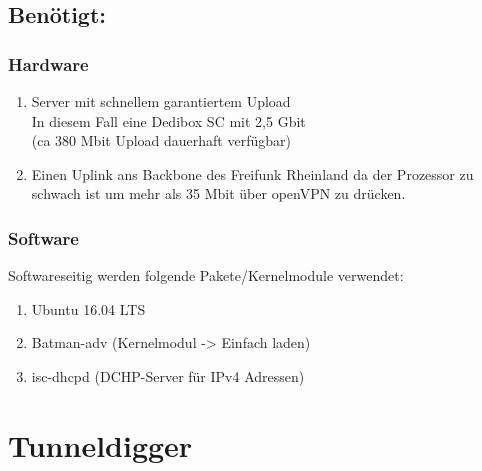 \subsection{Benötigt:}
\subsubsection{Hardware}
  \begin{enumerate}
    \item Server mit schnellem garantiertem Upload\\
          In diesem Fall eine Dedibox SC mit 2,5 Gbit \\
          (ca 380 Mbit Upload dauerhaft verfügbar)
    \item Einen Uplink ans Backbone des Freifunk Rheinland da der Prozessor zu schwach ist um mehr als 35 Mbit über openVPN zu drücken.  
  \end{enumerate}

\subsubsection{Software}
Softwareseitig werden folgende Pakete/Kernelmodule verwendet:
\begin{enumerate} 
   \item  Ubuntu 16.04 LTS 
   \item  Batman-adv (Kernelmodul -> Einfach laden)
   \item  isc-dhcpd (DCHP-Server für IPv4 Adressen)
\end{enumerate}



\section{Tunneldigger}
